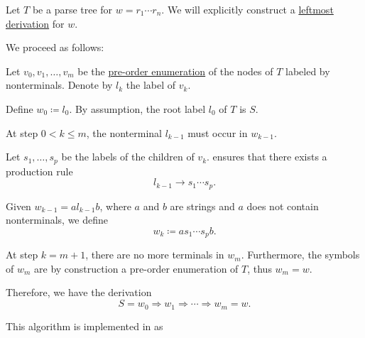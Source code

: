 \begin{algorithm}\label{alg:parse_tree_to_leftmost_derivation}
  Let \( T \) be a parse tree for \( w = r_1 \cdots r_n \). We will explicitly construct a \hyperref[def:leftmost_derivation]{leftmost derivation} for \( w \).

  We proceed as follows:
  \begin{thmenum}
     Let \( v_0, v_1, \ldots, v_m \) be the \hyperref[def:ordered_tree_enumeration]{pre-order enumeration} of the nodes of \( T \) labeled by nonterminals. Denote by \( l_k \) the label of \( v_k \).

    Define \( w_0 \coloneqq l_0 \). By assumption, the root label \( l_0 \) of \( T \) is \( S \).

     At step \( 0 < k \leq m \), the nonterminal \( l_{k-1} \) must occur in \( w_{k-1} \).

    Let \( s_1, \ldots, s_p \) be the labels of the children of \( v_k \).  ensures that there exists a production rule
    \begin{equation*}
      l_{k-1} \to s_1 \cdots s_p.
    \end{equation*}

    Given \( w_{k-1} = a l_{k-1} b \), where \( a \) and \( b \) are strings and \( a \) does not contain nonterminals, we define
    \begin{equation*}
      w_k \coloneqq a s_1 \cdots s_p b.
    \end{equation*}

     At step \( k = m + 1 \), there are no more terminals in \( w_m \). Furthermore, the symbols of \( w_m \) are by construction a pre-order enumeration of \( T \), thus \( w_m = w \).

    Therefore, we have the derivation
    \begin{equation*}
      S = w_0 \Rightarrow w_1 \Rightarrow \cdots \Rightarrow w_m = w.
    \end{equation*}
  \end{thmenum}
\end{algorithm}
\begin{comments}
  \item This algorithm is implemented in \cite{notebook:code} as
  \begin{CodeRefDisplay}
  \end{CodeRefDisplay}
\end{comments}

